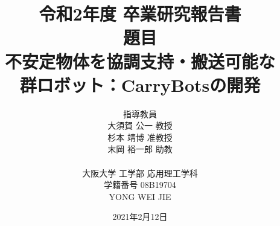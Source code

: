 \title{
\vspace*{-3cm}
{\Large 令和2年度 卒業研究報告書}
\vspace{1cm} \\
 {\Large 題目} \\
{\LARGE \bf 不安定物体を協調支持・搬送可能な\\群ロボット：CarryBotsの開発}\\
\vspace{2.5cm}
 }
\author{
指導教員 \vspace{0.1cm} \\
{\Large 大須賀 公一 教授} \\
{\Large 杉本 靖博 准教授} \\
{\Large 末岡 裕一郎 助教} \\
\vspace{1cm}\\
{\Large 大阪大学 工学部 応用理工学科}\\
  {\Large 学籍番号 08B19704}
  \vspace{0.5cm} \\
  {\LARGE YONG WEI JIE}
\vspace{1.5cm}
}
\date{
{\Large 2021年2月12日}
}
\maketitle